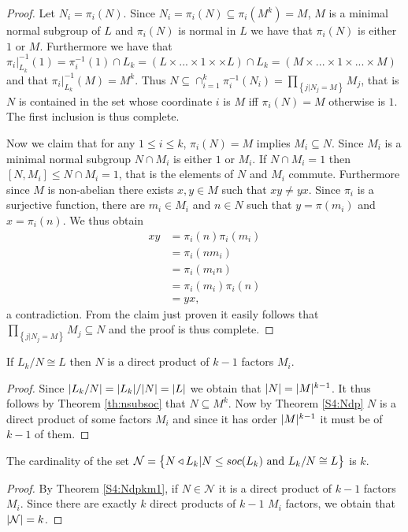 \begin{proof}
    Let $N_i = \pi_i(N)$. Since $N_i = \pi_i(N) \subseteq \pi_i(M^k) = M$, $M$ is a minimal normal subgroup of $L$ and $\pi_i(N)$ is normal in $L$ we have that $\pi_i(N)$ is either $1$ or $M$.
    Furthermore we have that $\pi_i|_{L_k}^{-1}(1) = \pi_i^{-1}(1) \cap L_k = (L \times ... \times 1 \times \times L) \cap L_k = (M \times ... \times 1 \times ... \times M)$ and that $\pi_i|_{L_k}^{-1}(M) = M^k$.
    Thus $N \subseteq \cap_{i=1}^k \pi_i^{-1}(N_i) = \prod_{\left\{j | N_j = M \right\}} M_j$, that is $N$ is contained in the set whose coordinate $i$ is $M$ iff $\pi_i(N) = M$ otherwise is $1$. The first inclusion is thus complete.

    Now we claim that for any $1 \le i \le k$, $\pi_i(N) = M$ implies $M_i \subseteq N$. Since $M_i$ is a minimal normal subgroup $N \cap M_i$ is either $1$ or $M_i$. If $N \cap M_i = 1$ then $[N, M_i] \le N \cap M_i = 1$, that is the elements of $N$ and $M_i$ commute. Furthermore since $M$ is non-abelian there exists $x,y \in M$ such that $xy \ne yx$. Since $\pi_i$ is a surjective function, there are $m_i \in M_i$ and $n \in N$ such that $y= \pi(m_i)$ and $x = \pi_i(n)$. We thus obtain 
    \begin{align*}
        xy &= \pi_i(n)\pi_i(m_i) \\ 
           &= \pi_i(nm_i) \\
           &= \pi_i(m_in) \\
           &= \pi_i(m_i)\pi_i(n) \\
           &=yx,
    \end{align*}
    a contradiction.
    From the claim just proven it easily follows that $\prod_{\left\{j | N_j = M \right\}} M_j \subseteq N$ and the proof is thus complete.

\end{proof}

\begin{theorem}
    \label{S4:Ndpkm1}
    If $L_k/N \cong L$ then $N$ is a direct product of $k-1$ factors $M_i$.
\end{theorem}

\begin{proof}
    Since $| L_k/N | = | L_k | / | N | = | L |$ we obtain that $| N | = | M |^{k-1}$. It thus follows by Theorem \ref{th:nsubsoc} that $N \subseteq M^k$. Now by Theorem \ref{S4:Ndp} $N$ is a direct product of some factors $M_i$ and since it has order $| M |^{k-1}$ it must be of $k-1$ of them. 
\end{proof}

\begin{theorem}
    The cardinality of the set $\mathcal{N} = \left\{N \triangleleft L_k | N \le soc {(L_k)} \text{ and } L_k /N \cong L \right\}$ is $k$.
\end{theorem}

\begin{proof}
    By Theorem \ref{S4:Ndpkm1}, if $N \in \mathcal{N}$ it is a direct product of $k-1$ factors $M_i$. Since there are exactly $k$ direct products of $k-1$ $M_i$ factors, we obtain that $| \mathcal{N} | = k$.
\end{proof}